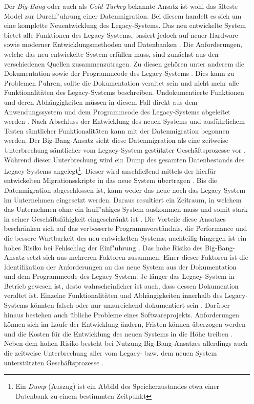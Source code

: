 Der \textit{Big-Bang} oder auch als \textit{Cold Turkey} bekannte Ansatz ist wohl das älteste Model zur Durchf"uhrung einer Datenmigration. Bei diesem handelt es sich um eine komplette Neuentwicklung des Legacy-Systems. Das neu entwickelte System bietet alle Funktionen des Legacy-Systems, basiert jedoch auf neuer Hardware sowie moderner Entwicklungsmethoden und Datenbanken \citep[S.~105]{bisbal-1999}.
\lb
Die Anforderungen, welche das neu entwickelte System erfüllen muss, sind zunächst aus den verschiedenen Quellen zusammenzutragen. Zu diesen gehören unter anderem die Dokumentation sowie der Programmcode des Legacy-Systems \citep[S.~2]{brodie-1993}. Dies kann zu Problemen f"uhren, sollte die Dokumentation veraltet sein und nicht mehr alle Funktionalitäten des Legacy-Systems beschreiben. Undokumentierte Funktionen und deren Abhängigkeiten müssen in diesem Fall direkt aus dem Anwendungssystem und dem Programmcode des Legacy-Systems abgeleitet werden \citep[S.~2]{brodie-1993} .
\lb
Nach Abschluss der Entwicklung des neuen Systems und ausführlichem Testen sämtlicher Funktionalitäten kann mit der Datenmigration begonnen werden. Der Big-Bang-Ansatz sieht diese Datenmigration als eine zeitweise Unterbrechung sämtlicher vom Legacy-System gestützter Geschäftsprozesse vor \citep[S.~4]{wuLawless-1997}. Während dieser Unterbrechung wird ein Dump des gesamten Datenbestands des Legacy-Systems angelegt\footnote{Ein \textit{Dump} (Auszug) ist ein Abbild des Speicherzustandes etwa einer Datenbank zu einem bestimmten Zeitpunkt}. Dieser wird anschließend mittels der hierfür entwickelten Migrationsskripte in das neue System übertragen \citep[S.~3]{brodie-1993}. Bis die Datenmigration abgeschlossen ist, kann weder das neue noch das Legacy-System im Unternehmen eingesetzt werden. Daraus resultiert ein Zeitraum, in welchem das Unternehmen ohne ein lauff"ahiges System auskommen muss und somit stark in seiner Geschäftsfähigkeit eingeschränkt ist \citep[S.~3f.]{brodie-1993}.
\lb
Die Vorteile diese Ansatzes beschränken sich auf das verbesserte Programmverständnis, die Performance und die bessere Wartbarkeit des neu entwickelten Systems, nachteilig hingegen ist ein hohes Risiko bei Fehlschlag der Einf"uhrung \citep[S.~105]{bisbal-1999}. Das hohe Risiko des Big-Bang-Ansatz setzt sich aus mehreren Faktoren zusammen. Einer dieser Faktoren ist die Identifikation der Anforderungen an das neue System aus der Dokumentation und dem Programmcode des Legacy-System. Je länger das Legacy-System in Betrieb gewesen ist, desto wahrscheinlicher ist auch, dass dessen Dokumention veraltet ist. Einzelne Funktionalitäten und Abhängigkeiten innerhalb des Legacy-Systems könnten falsch oder nur unzureichend dokumentiert sein \citep[S.~2]{brodie-1993}. Darüber hinaus bestehen auch übliche Probleme eines Softwareprojekts. Anforderungen können sich im Laufe der Entwicklung ändern, Fristen können überzogen werden und die Kosten für die Entwicklung des neuen Systems in die Höhe treiben \citep[S.~2f.]{brodie-1993}. Neben dem hohen Risiko besteht bei Nutzung Big-Bang-Ansatzes allerdings auch die zeitweise Unterbrechung aller vom Legacy- bzw. dem neuen System unterstützten Geschäftsprozesse \citep[S.~4]{wuLawless-1997}.
